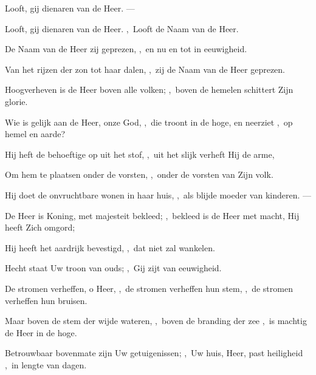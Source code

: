 \documentclass[12pt,twoside,a5paper]{article}
\begin{document}
\begin{halfparskip}
   Looft, gij dienaren van de Heer. --- 

  Looft, gij dienaren van de Heer. \sep\ Looft de Naam van de Heer.

  De Naam van de Heer zij geprezen, \sep\ en nu en tot in eeuwigheid.

  Van het rijzen der zon tot haar dalen, \sep\ zij de Naam van de Heer geprezen.

  Hoogverheven is de Heer boven alle volken; \sep\ boven de hemelen schittert Zijn glorie.

  Wie is gelijk aan de Heer, onze God, \sep\ die troont in de hoge, en neerziet \sep\ op hemel en aarde?

  Hij heft de behoeftige op uit het stof, \sep\ uit het slijk verheft Hij de arme,

  Om hem te plaatsen onder de vorsten, \sep\ onder de vorsten van Zijn volk.

  Hij doet de onvruchtbare wonen in haar huis, \sep\ als blijde moeder van kinderen. --- 
\end{halfparskip}


\begin{halfparskip}
   De Heer is Koning, met majesteit bekleed; \sep\ bekleed is de Heer met macht, Hij heeft Zich omgord;

  Hij heeft het aardrijk bevestigd, \sep\ dat niet zal wankelen.

  Hecht staat Uw troon van ouds; \sep\ Gij zijt van eeuwigheid.

  De stromen verheffen, o Heer, \sep\ de stromen verheffen hun stem, \sep\ de stromen verheffen hun bruisen.

  Maar boven de stem der wijde wateren, \sep\ boven de branding der zee \sep\ is machtig de Heer in de hoge.

  Betrouwbaar bovenmate zijn Uw getuigenissen; \sep\ Uw huis, Heer, past heiligheid \sep\ in lengte van dagen.
\end{halfparskip}
\end{document}
